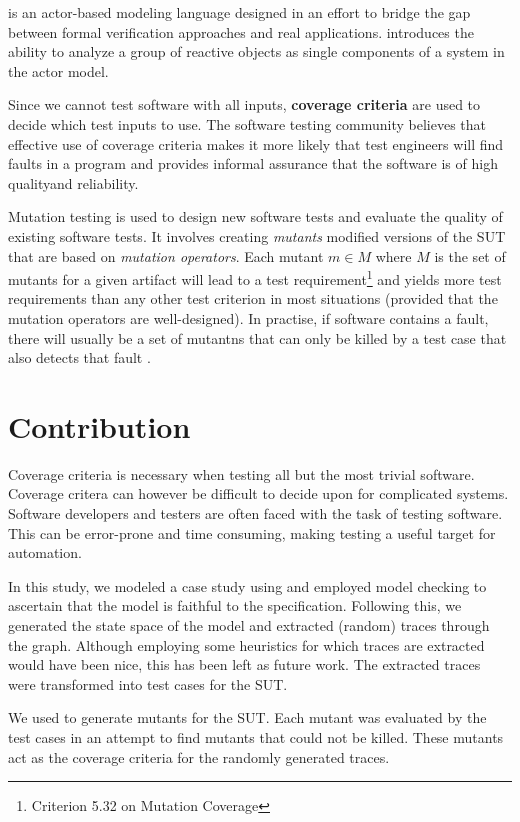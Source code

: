 \documentclass{article}
\begin{document}
		\Rebeca is an actor-based modeling language designed in an effort to bridge the gap between formal verification approaches and real applications. \Rebeca introduces the ability to analyze a group of reactive objects as single components of a system in the actor model.

		Since we cannot test software with all inputs, \textbf{coverage criteria} are used to decide which test inputs to use. The software testing community believes that effective use of coverage criteria makes it more likely that test engineers will find faults in a program and provides informal assurance that the software is of high qualityand reliability. 

		Mutation testing is used to design new software tests and evaluate the quality of existing software tests. It involves creating \textit{mutants} modified versions of the SUT that are based on \textit{mutation operators}. Each mutant $m \in M$ where $M$ is the set of mutants for a given artifact will lead to a test requirement\footnote{Criterion 5.32 on Mutation Coverage} and yields more test requirements than any other test criterion in most situations (provided that the mutation operators are well-designed). In practise, if software contains a fault, there will usually be a set of mutantns that can only be killed by a test case that also detects that fault \citep{ammann2008introduction}.

	\section{Contribution}
		Coverage criteria is necessary when testing all but the most trivial software. Coverage critera can however be difficult to decide upon for complicated systems. Software developers and testers are often faced with the task of testing software. This can be error-prone and time consuming, making testing a useful target for automation.

		In this study, we modeled a case study using \Rebeca and employed model checking to ascertain that the model is faithful to the specification. Following this, we generated the state space of the model and extracted (random) traces through the graph. Although employing some heuristics for which traces are extracted would have been nice, this has been left as future work. The extracted traces were transformed into test cases for the SUT.

		We used \citeauthor{mujava} to generate mutants for the SUT. Each mutant was evaluated by the test cases in an attempt to find mutants that could not be killed. These mutants act as the coverage criteria for the randomly generated traces.
\end{document}
